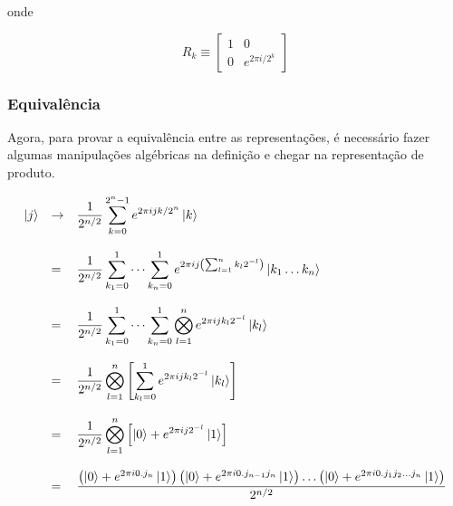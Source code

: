onde

\[
    R_k \equiv
    \begin{bmatrix}
        1 & 0 \\
        0 & e^{2\pi i / 2^k}
    \end{bmatrix}
\]

\subsubsection{Equivalência}\label{subsubsec:equivalencia}

Agora, para provar a equivalência entre as representações, é necessário fazer algumas manipulações algébricas na definição e chegar na representação de produto.

\[
    \begin{array}{lll}
        \ket{j} &\to& \displaystyle\dfrac{1}{2^{n/2}} \sum_{k=0}^{2^n-1} e^{2\pi ijk/2^n} \ket{k} \\ \\
        &=& \displaystyle\dfrac{1}{2^{n/2}} \sum_{k_1=0}^{1} \dots \sum_{k_n=0}^{1} e^{2\pi ij \left( \sum_{l=1}^{n}k_l 2^{-l} \right)} \ket{k_1 \dots k_n} \\ \\
        &=& \displaystyle\dfrac{1}{2^{n/2}} \sum_{k_1=0}^{1} \dots \sum_{k_n=0}^{1} \bigotimes_{l=1}^{n} e^{2\pi ij k_l 2^{-l}} \ket{k_l} \\ \\
        &=& \displaystyle\dfrac{1}{2^{n/2}} \bigotimes_{l=1}^{n} \left[ \sum_{k_l=0}^{1} e^{2\pi ij k_l 2^{-l}} \ket{k_l} \right] \\ \\
        &=& \displaystyle\dfrac{1}{2^{n/2}} \bigotimes_{l=1}^{n} \left[ \ket{0} + e^{2\pi ij 2^{-l}} \ket{1} \right] \\ \\
        &=& \dfrac{\left( \ket{0} + e^{2\pi i 0.j_n} \ket{1} \right) \left( \ket{0} + e^{2\pi i 0.j_{n-1}j_n} \ket{1} \right) \dots \left( \ket{0} + e^{2\pi i 0.j_1 j_2 \dots j_n} \ket{1} \right)}{2^{n/2}}
    \end{array}
\]